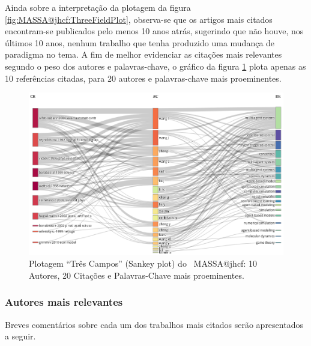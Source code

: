 Ainda sobre a interpretação da plotagem da figura \ref{fig:MASSA@jhcf:ThreeFieldPlot}, observa-se que os artigos mais citados encontram-se publicados pelo menos 10 anos atrás, sugerindo que não houve, nos últimos 10 anos, nenhum trabalho que tenha produzido uma mudança de paradigma no tema.
A fim de melhor evidenciar as citações mais relevantes segundo o peso dos autores e palavras-chave, o gráfico da figura \ref{fig:MASSA@jhcf:ThreeFieldPlot:10-20-20} plota apenas as 10 referências citadas, para 20 autores e palavras-chave mais proeminentes.

\begin{figure}
    \centering
    \includegraphics[angle=0,width=1\textwidth]{experiments/jhcf/PesqBibliogr/SimulacaoMultiagente/WoS-20210803/classico-mais-citacoes/Dataset/ThreeFieldPlot-AU-CR-DE-20-10-20.png}
    \caption{Plotagem ``Três Campos'' (Sankey plot) do \dataset\   MASSA@jhcf: 10 Autores, 20 Citações e Palavras-Chave mais proeminentes.}
    \label{fig:MASSA@jhcf:ThreeFieldPlot:10-20-20}
\end{figure}

\subsubsection{Autores mais relevantes\label{MASSA:Sankey:AutoresRelevantes}}

Breves comentários sobre cada um dos trabalhos mais citados serão apresentados a seguir.

